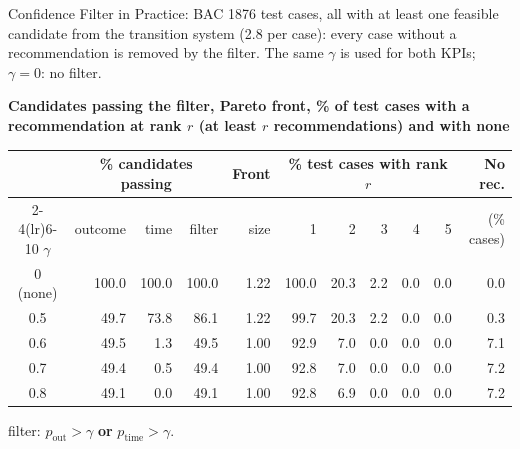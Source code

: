\documentclass[aspectratio=169]{beamer} %
\begin{document}
\begin{frame}{Confidence Filter in Practice: BAC}
  \small
  1876 test cases, \alert{all} with at least one feasible candidate from the transition system
  (2.8 per case): every case without a recommendation is removed by the filter. The same $\gamma$ is used for
  both KPIs; $\gamma = 0$: no filter.

  \textbf{Candidates passing the filter, Pareto front, \% of test cases with a recommendation at rank $r$ (at least $r$ recommendations) and with none}
  \begin{center}\setlength{\tabcolsep}{4pt}\setlength{\aboverulesep}{0pt}\setlength{\belowrulesep}{1pt}
  \begin{tabular}{crrrrrrrrrr}
    \toprule
     & \multicolumn{3}{c}{\% candidates passing} & Front & \multicolumn{5}{c}{\% test cases with rank $r$} & No rec. \\
    \cmidrule(lr){2-4}\cmidrule(lr){6-10}
    $\gamma$ & outcome & time & filter & size & 1 & 2 & 3 & 4 & 5 & (\% cases) \\
    \midrule
    0 (none) & 100.0 & 100.0 & 100.0 & 1.22 & 100.0 & 20.3 & 2.2 & 0.0 & 0.0 & 0.0 \\
    0.5      & 49.7  & 73.8  & 86.1  & 1.22 & 99.7  & 20.3 & 2.2 & 0.0 & 0.0 & 0.3 \\
    0.6      & 49.5  & 1.3   & 49.5  & 1.00 & 92.9  & 7.0  & 0.0 & 0.0 & 0.0 & 7.1 \\
    0.7      & 49.4  & 0.5   & 49.4  & 1.00 & 92.8  & 7.0  & 0.0 & 0.0 & 0.0 & 7.2 \\
    0.8      & 49.1  & 0.0   & 49.1  & 1.00 & 92.8  & 6.9  & 0.0 & 0.0 & 0.0 & 7.2 \\
    \bottomrule
  \end{tabular}
  \end{center}
  {\scriptsize filter: $p_{\text{out}} > \gamma$ \textbf{or} $p_{\text{time}} > \gamma$.}
\end{frame}
\end{document}
